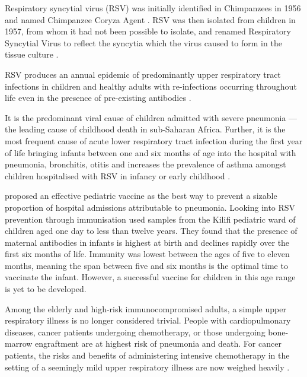 \documentclass[10pt, a4paper]{article}
\begin{document}
Respiratory syncytial virus (RSV) was initially identified in Chimpanzees in
1956 and named Chimpanzee Coryza Agent \cite{morrisRecoveryCytopathogenicAgent1956}.
RSV was then isolated from children in 1957, from whom it had not been possible
to isolate, and renamed Respiratory Syncytial Virus to reflect the syncytia
which the virus caused to form in the tissue culture
\cite{chanockRecoveryInfantsRespiratory1957,beemAssociationChimpanzeeCoryza1960,falseyRespiratorySyncytialVirus2000}.

RSV produces an annual epidemic of predominantly upper respiratory tract
infections in children and healthy adults with re-infections occurring throughout
life even in the presence of pre-existing antibodies
\cite{nyiroDefiningVaccinationWindow2017,munoz-escalanteRespiratorySyncytialVirus2019,namRespiratorySyncytialVirus2019}.

It is the predominant viral cause of children admitted with severe pneumonia
\cite{berkleyViralEtiologySevere2010}
—the leading cause of childhood death in sub-Saharan Africa.
Further, it is the most frequent cause of acute lower respiratory tract
infection during the first year of life bringing infants between one and six
months of age into the hospital with pneumonia, bronchitis, otitis and increases
the prevalence of asthma amongst children hospitalised with RSV in infancy or
early childhood
\cite{borchersRespiratorySyncytialVirus2013,zlatevaMolecularEvolutionCirculation2004}.

\cite{nokesIncidenceSeverityRespiratory2009} proposed an effective pediatric
vaccine as the best way to prevent a sizable proportion of hospital admissions
attributable to pneumonia.
Looking into RSV prevention through immunisation
\cite{nyiroDefiningVaccinationWindow2017} used samples from the Kilifi pediatric
ward of children aged one day to less than twelve years.
They found that the presence of maternal antibodies in infants is highest at
birth and declines rapidly over the first six months of life.
Immunity was lowest between the ages of five to eleven months, meaning the span
between five and six months is the optimal time to vaccinate the infant.
However, a successful vaccine for children in this age range is yet to be
developed.

Among the elderly and high-risk immunocompromised adults, a simple upper
respiratory illness is no longer considered trivial.
People with cardiopulmonary diseases, cancer patients undergoing chemotherapy,
or those undergoing bone-marrow engraftment are at highest risk of pneumonia and
death.
For cancer patients, the risks and benefits of administering intensive
chemotherapy in the setting of a seemingly mild upper respiratory illness are
now weighed heavily
\cite{falseyRespiratorySyncytialVirus2000,whimbeyRespiratorySyncytialVirus2000}.
\end{document}
